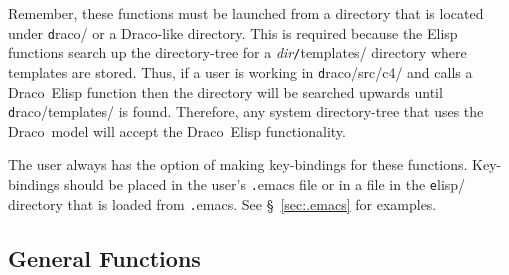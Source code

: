 \documentclass[11pt]{nmemo}
\newcommand{\comp}[1]{{\normalfont\texttt#1}}
\newcommand{\draco}{{\normalfont\sffamily Draco}}
\begin{document}
Remember, these functions must be launched from a directory that is
located under \comp{draco/} or a \draco-like directory.  This is
required because the Elisp functions search up the directory-tree for
a \textsl{dir}\comp{/templates/} directory where templates are stored.
Thus, if a user is working in \comp{draco/src/c4/} and calls a \draco\ 
Elisp function then the directory will be searched upwards until
\comp{draco/templates/} is found.  Therefore, any system
directory-tree that uses the \draco\ model will accept the \draco\ 
Elisp functionality.

The user always has the option of making key-bindings for these
functions.  Key-bindings should be placed in the user's \comp{.emacs}
file or in a file in the \comp{elisp/} directory that is loaded from
\comp{.emacs}.  See \S~\ref{sec:.emacs} for examples.

\subsection{General Functions}
\label{sec:gfunc}
\end{document}
